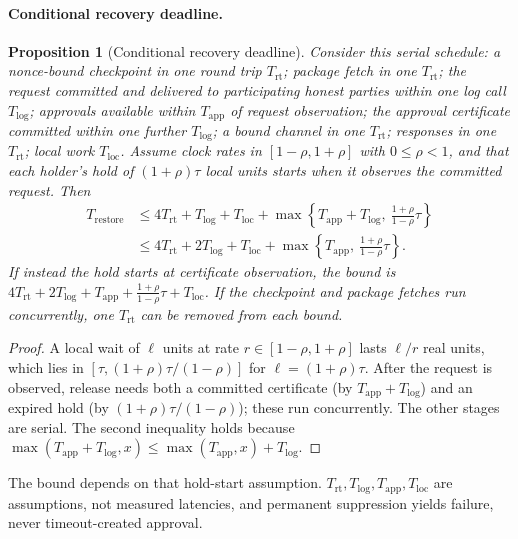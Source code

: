 \documentclass[pdflatex,sn-mathphys-num]{sn-jnl}
\theoremstyle{plain}
\newtheorem{proposition}[lemma]{Proposition}
\begin{document}
\paragraph{Conditional recovery deadline.}
\begin{proposition}[Conditional recovery deadline]\label{prop:deadline}
Consider this serial schedule: a nonce-bound checkpoint in one round trip $T_{\mathrm{rt}}$; package fetch in one $T_{\mathrm{rt}}$; the request committed and delivered to participating honest parties within one log call $T_{\mathrm{log}}$; approvals available within $T_{\mathrm{app}}$ of request observation; the approval certificate committed within one further $T_{\mathrm{log}}$; a bound channel in one $T_{\mathrm{rt}}$; responses in one $T_{\mathrm{rt}}$; local work $T_{\mathrm{loc}}$. Assume clock rates in $[1-\rho,1+\rho]$ with $0\le\rho<1$, and that each holder's hold of $(1+\rho)\tau$ local units starts when it observes the committed request. Then
\begin{equation}\label{eq:deadline}
\begin{split}
 T_{\mathrm{restore}}&\le4T_{\mathrm{rt}}+T_{\mathrm{log}}+T_{\mathrm{loc}}+\max\!\left\{T_{\mathrm{app}}+T_{\mathrm{log}},\ \tfrac{1+\rho}{1-\rho}\tau\right\}\\
 &\le4T_{\mathrm{rt}}+2T_{\mathrm{log}}+T_{\mathrm{loc}}+\max\!\left\{T_{\mathrm{app}},\ \tfrac{1+\rho}{1-\rho}\tau\right\}.
\end{split}
\end{equation}
If instead the hold starts at certificate observation, the bound is $4T_{\mathrm{rt}}+2T_{\mathrm{log}}+T_{\mathrm{app}}+\frac{1+\rho}{1-\rho}\tau+T_{\mathrm{loc}}$. If the checkpoint and package fetches run concurrently, one $T_{\mathrm{rt}}$ can be removed from each bound.
\end{proposition}
\begin{proof}
A local wait of $\ell$ units at rate $r\in[1-\rho,1+\rho]$ lasts $\ell/r$ real units, which lies in $[\tau,(1+\rho)\tau/(1-\rho)]$ for $\ell=(1+\rho)\tau$. After the request is observed, release needs both a committed certificate (by $T_{\mathrm{app}}+T_{\mathrm{log}}$) and an expired hold (by $(1+\rho)\tau/(1-\rho)$); these run concurrently. The other stages are serial. The second inequality holds because $\max(T_{\mathrm{app}}+T_{\mathrm{log}},x)\le\max(T_{\mathrm{app}},x)+T_{\mathrm{log}}$.
\end{proof}

The bound depends on that hold-start assumption. $T_{\mathrm{rt}},T_{\mathrm{log}},T_{\mathrm{app}},T_{\mathrm{loc}}$ are assumptions, not measured latencies, and permanent suppression yields failure, never timeout-created approval.
\end{document}
